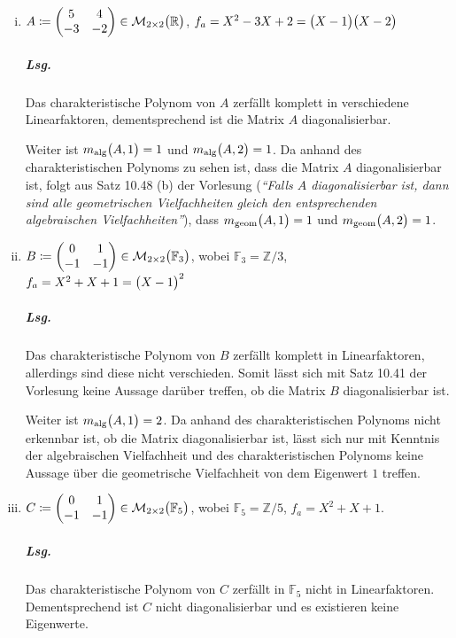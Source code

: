 \documentclass{scrreprt}
\begin{document}
\begin{enumerate}[(i)]
\item $A \coloneqq \begin{pmatrix}
    5 & 4 \\
    -3 & -2 \\
  \end{pmatrix} \in \mathcal{M}_{2 \times 2} \qty\big(\mathbb{R})$,
  $f_a = X^2 - 3X + 2 = \qty\big(X - 1)\qty\big(X - 2)$

  \subparagraph{Lsg.} Das charakteristische Polynom von $A$ zerfällt komplett
  in verschiedene Linearfaktoren, dementsprechend ist die Matrix $A$
  diagonalisierbar.

  Weiter ist $m_{\text{alg}}\qty\big(A, 1) = 1$ und
  $m_{\text{alg}}\qty\big(A, 2) = 1$.
  Da anhand des charakteristischen Polynoms zu sehen ist, dass die Matrix
  $A$ diagonalisierbar ist, folgt aus Satz 10.48 (b) der Vorlesung
  (\emph{``Falls $A$ diagonalisierbar ist, dann sind alle geometrischen
    Vielfachheiten gleich den entsprechenden algebraischen Vielfachheiten''}),
  dass $m_{\text{geom}}\qty\big(A, 1) = 1$ und
  $m_{\text{geom}}\qty\big(A, 2) = 1$.

\item $B \coloneqq \begin{pmatrix}
    0 & 1 \\
    -1 & -1 \\
  \end{pmatrix} \in \mathcal{M}_{2 \times 2} \qty\big(\mathbb{F}_3)$,
  wobei $\mathbb{F}_3 = \mathbb{Z}/3$,
  $f_a = X^2 + X + 1 = \qty\big(X - 1)^2$

  \subparagraph{Lsg.} Das charakteristische Polynom von $B$ zerfällt komplett in
  Linearfaktoren, allerdings sind diese nicht verschieden.
  Somit lässt sich mit Satz 10.41 der Vorlesung keine Aussage darüber treffen,
  ob die Matrix $B$ diagonalisierbar ist.

  Weiter ist $m_{\text{alg}}\qty\big(A, 1) = 2$.
  Da anhand des charakteristischen Polynoms nicht erkennbar ist, ob
  die Matrix diagonalisierbar ist, lässt sich nur mit Kenntnis der
  algebraischen Vielfachheit und des charakteristischen Polynoms keine
  Aussage über die geometrische Vielfachheit von dem Eigenwert $1$ treffen.

\item $C \coloneqq \begin{pmatrix}
    0 & 1 \\
    -1 & -1 \\
  \end{pmatrix} \in \mathcal{M}_{2 \times 2} \qty\big(\mathbb{F}_5)$,
  wobei $\mathbb{F}_5 = \mathbb{Z}/5$,
  $f_a = X^2 + X + 1$.

  \subparagraph{Lsg.} Das charakteristische Polynom von $C$ zerfällt in
  $\mathbb{F}_5$ nicht in Linearfaktoren.
  Dementsprechend ist $C$ nicht diagonalisierbar und es existieren keine
  Eigenwerte.
\end{enumerate}
\end{document}
